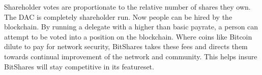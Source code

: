     Shareholder votes are proportionate to the relative number of shares they own. The DAC is completely shareholder run.
    Now people can be hired by the blockchain. By running a delegate with a higher than basic payrate, a person can attempt to be voted into a position on the blockchain. Where coins like Bitcoin dilute to pay for network security, BitShares takes these fees and directs them towards continual improvement of the network and community. This helps insure BitShares will stay competitive in its featureset.

